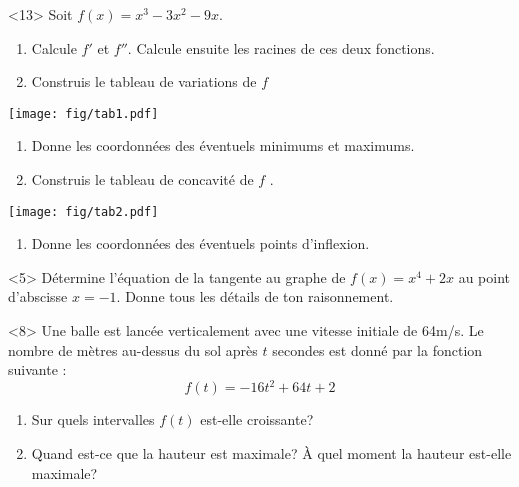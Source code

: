 \documentclass[a4paper,12pt, rulers]{tests2}
\providecommand{\tightlist}{%
  \setlength{\itemsep}{0pt}\setlength{\parskip}{0pt}}
\begin{document}
\begin{question}<13>
Soit \(f(x)=x^3-3x^2-9x\).

\begin{enumerate}
\def\labelenumi{\arabic{enumi}.}
\item
  Calcule \(f'\) et \(f''\). Calcule ensuite les racines de ces deux
  fonctions.\vspace{5cm}
\item
  Construis le tableau de variations de \(f\)
\end{enumerate}

\texttt{[image: fig/tab1.pdf]}

\begin{enumerate}
\def\labelenumi{\arabic{enumi}.}
\setcounter{enumi}{2}
\item
  Donne les coordonnées des éventuels minimums et maximums.\vspace{3cm}
\item
  Construis le tableau de concavité de \(f\) .
\end{enumerate}

\texttt{[image: fig/tab2.pdf]}

\begin{enumerate}
\def\labelenumi{\arabic{enumi}.}
\setcounter{enumi}{4}
\tightlist
\item
  Donne les coordonnées des éventuels points d'inflexion.
\end{enumerate}

\end{question}

\newpage

\begin{question}<5> Détermine l'équation de la tangente au graphe de
\(f(x)=x^4+2x\) au point d'abscisse \(x=-1\). Donne tous les détails de
ton raisonnement.\end{question}
\vspace{5cm}
\begin{question}<8>
Une balle est lancée verticalement avec une vitesse initiale de 64m/s.
Le nombre de mètres au-dessus du sol après \(t\) secondes est donné par
la fonction suivante : \[
f(t)=-16t^2+64t+2
\]

\begin{enumerate}
\def\labelenumi{\arabic{enumi}.}
\tightlist
\item
  Sur quels intervalles \(f(t)\) est-elle croissante?
\item
  Quand est-ce que la hauteur est maximale? À quel moment la hauteur
  est-elle maximale?
\end{enumerate}

\end{question}
\end{document}
